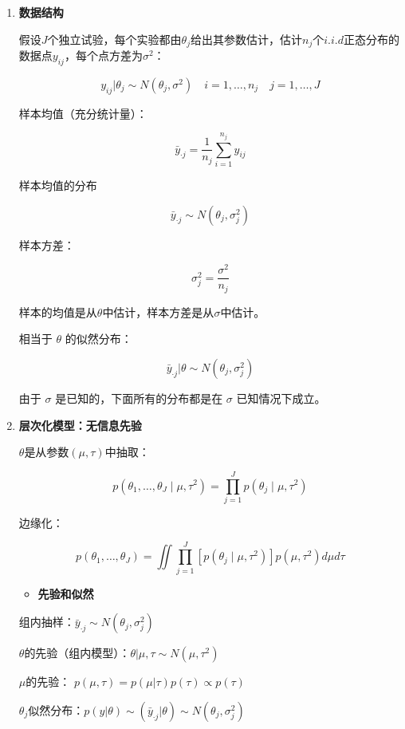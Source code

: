 \begin{enumerate}
\def\labelenumi{\arabic{enumi}.}
\item
  \textbf{数据结构}


假设\(J\)个独立试验，每个实验都由\(\theta_j\)给出其参数估计，估计\(n_j\)个\(i.i.d\)正态分布的数据点\(y_{ij}\)，每个点方差为\(\sigma^2\)：

\[y_{i j} | \theta_{j} \sim N\left(\theta_{j}, \sigma^{2}\right) \quad i=1, \ldots, n_{j} \quad j=1, \ldots, J\]

样本均值（充分统计量）：

\[\bar{y}_{\cdot j}=\frac{1}{n_j}\sum_{i=1}^{n_j}y_{ij}\]

样本均值的分布

\[\bar y_{\cdot j} \sim N(\theta_j,\sigma^2_j)\]

样本方差：

\[\sigma^2_j=\frac{\sigma^2}{n_j}\]

样本的均值是从\(\theta\)中估计，样本方差是从\(\sigma\)中估计。

相当于 \(\theta\) 的似然分布：

\[\bar y_{\cdot j}|\theta \sim N(\theta_j,\sigma^2_j)\]

由于 \(\sigma\) 是已知的，下面所有的分布都是在 \(\sigma\)
已知情况下成立。


\item
  \textbf{层次化模型：无信息先验}


\(\theta\)是从参数\((\mu,\tau)\)中抽取：

\[p\left(\theta_{1}, \ldots, \theta_{J} \mid \mu, \tau^{2}\right)=\prod_{j=1}^{J} p\left(\theta_{j} \mid \mu, \tau^{2}\right)\]

边缘化：

\[p\left(\theta_{1}, \ldots, \theta_{J}\right)=
\iint \prod_{j=1}^{J}
\left[p\left(\theta_{j} \mid \mu, \tau^{2}\right)\right] 
p\left(\mu, \tau^{2}\right)
d \mu d \tau\]

\begin{itemize}
\item
  \textbf{先验和似然}
\end{itemize}

组内抽样：\(\bar y_{\cdot j} \sim N(\theta_j,\sigma^2_j)\)

\(\theta\)的先验（组内模型）：\(\theta|\mu,\tau \sim N(\mu,\tau^2)\)

\(\mu\)的先验： \(p(\mu,\tau)=p(\mu|\tau)p(\tau)\propto p(\tau)\)

\(\theta_j\)似然分布：\(p(y|\theta)\sim(\bar y_{\cdot j}|\theta) \sim N(\theta_j,\sigma^2_j)\)


\end{enumerate}

